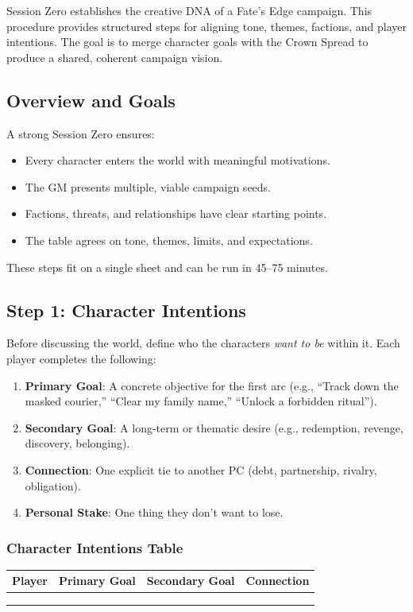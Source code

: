 \documentclass[11pt]{article}
\begin{document}
Session Zero establishes the creative DNA of a Fate's Edge campaign. This procedure provides structured steps for aligning tone, themes, factions, and player intentions. The goal is to merge character goals with the Crown Spread to produce a shared, coherent campaign vision.

\subsection{Overview and Goals}
A strong Session Zero ensures:
\begin{itemize}
    \item Every character enters the world with meaningful motivations.
    \item The GM presents multiple, viable campaign seeds.
    \item Factions, threats, and relationships have clear starting points.
    \item The table agrees on tone, themes, limits, and expectations.
\end{itemize}

These steps fit on a single sheet and can be run in 45--75 minutes.

\subsection{Step 1: Character Intentions}
Before discussing the world, define who the characters \emph{want to be} within it. Each player completes the following:

\begin{enumerate}
    \item \textbf{Primary Goal}: A concrete objective for the first arc (e.g., ``Track down the masked courier,'' ``Clear my family name,'' ``Unlock a forbidden ritual'').
    \item \textbf{Secondary Goal}: A long-term or thematic desire (e.g., redemption, revenge, discovery, belonging).
    \item \textbf{Connection}: One explicit tie to another PC (debt, partnership, rivalry, obligation).
    \item \textbf{Personal Stake}: One thing they don't want to lose.
\end{enumerate}

\subsubsection{Character Intentions Table}
\begin{center}
\begin{longtable}{|p{3cm}|p{4cm}|p{4cm}|p{3cm}|}
\hline
\textbf{Player} & \textbf{Primary Goal} & \textbf{Secondary Goal} & \textbf{Connection} \\
\hline
\phantom{Player} & & & \\
\phantom{Player} & & & \\
\phantom{Player} & & & \\
\hline
\end{longtable}
\end{center}
\end{document}
